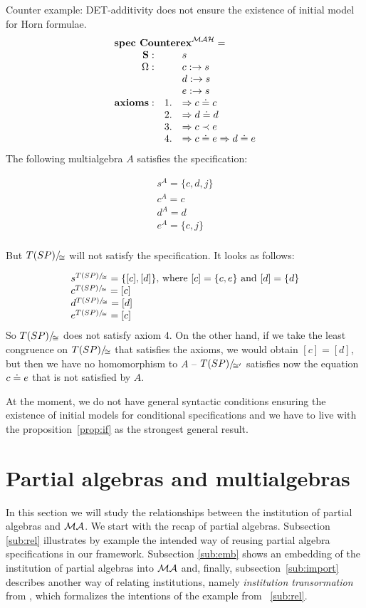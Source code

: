 \documentclass[10pt]{article}
\begin{document}
\begin{example}\label{ex:coinit}
Counter example: DET-additivity does not ensure the existence of initial model for Horn formulae.
\[ \spec{
	\tit{\mbox{\bf spec\ Counterex}^{\inst{MAH}}=} \\
		\Sorts: && s\\
		\Ops:   && c: \to s\\
			&& d:\to s\\
			&& e: \to s\\
		{\bf axioms:}			
		        &1.& \To c \eleq c\\
			&2.& \To d \eleq d\\
			&3.& \To c \prec e\\
			&4.& \To c \eleq e \To d \eleq e \\
}
\]
The following multialgebra $A$ satisfies the specification:

	\[ \begin{array}{l}
		s^A = \{ c,d,j \}\\
		c^A= c \\
		d^A= d \\
		e^A = \{c,j \} \\
	\end{array} \]

But $T(SP)/\!_{\cong}$ will not satisfy the specification. It looks as follows:

	\[ \begin{array}{l}
		s^{T(SP)/\!_{\cong}} =\{ [c], [d] \}\mbox{, where $[c] = \{c, e\}$ and $[d] = \{d\}$} \\
		c^{T(SP)/\!_{\cong}} =[c] \\
		d^{T(SP)/\!_{\cong}} =[d] \\
		e^{T(SP)/\!_{\cong}} =[c] \\
	\end{array} \]
So ${T(SP)/\!_{\cong}}$ does not satisfy axiom 4. On the other hand, if we
take the least congruence on ${T(SP)/\!_{\cong}}$ that satisfies the axioms,
we would obtain $[c]=[d]$, but then we have no homomorphism to $A$ --
${T(SP)/\!_{\cong'}}$ satisfies now the equation $c
\mathrel{\dot{=} } e$ that is not satisfied by $A$.
\end{example}
%
At the moment, we do not have general syntactic conditions ensuring the
existence of initial models for conditional specifications and we have to live with the
proposition~\ref{prop:if} as the strongest general result. 

\section{Partial algebras and multialgebras}\label{se:partial}
In this section we will study the relationships between the institution of
partial algebras and ${\mathcal{MA}}$. We start with the recap of partial
algebras. Subsection \ref{sub:rel} illustrates by example the intended way of
reusing partial algebra specifications in our framework. Subsection
\ref{sub:emb} shows an embedding of the institution of partial algebras into
${\mathcal{MA}}$ and, finally, subsection~\ref{sub:import} describes another way of
relating institutions, namely {\em institution transormation} from \cite{system}, which
formalizes the intentions of the example from ~\ref{sub:rel}.
\end{document}
